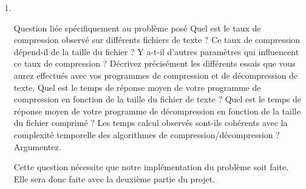 \documentclass[11pt]{article}
\begin{document}
\begin{enumerate}
\item
\item [Question liée spécifiquement au problème posé] Quel est le taux de compression
observé sur différents fichiers de texte ? Ce taux de compression dépend-il
de la taille du fichier ? Y a-t-il d’autres paramètres qui influencent ce taux de
compression ? Décrivez précisément les différents essais que vous aurez effectués
avec vos programmes de compression et de décompression de texte.
Quel est le temps de réponse moyen de votre programme de compression en
fonction de la taille du fichier de texte ? Quel est le temps de réponse moyen de
votre programme de décompression en fonction de la taille du fichier comprimé ?
Les temps calcul observés sont-ils cohérents avec la complexité temporelle
des algorithmes de compression/décompression ? Argumentez.

Cette question nécessite que notre implémentation du problème soit faite. 
Elle sera donc faite avec la deuxième partie du projet.

\end{enumerate}
\end{document}
